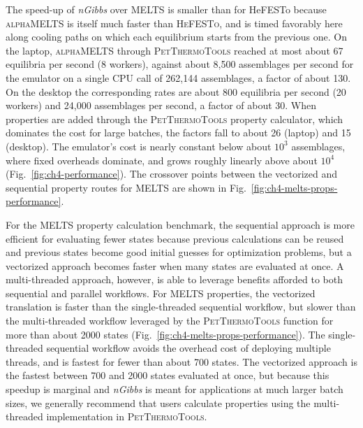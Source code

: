 The speed-up of \emph{nGibbs} over \textsc{MELTS} is smaller than for HeFESTo because \textsc{alphaMELTS} is itself much faster than \textsc{HeFESTo}, and is timed favorably
here along cooling paths on which each equilibrium starts from the previous one. On the laptop, \textsc{alphaMELTS} through
\textsc{PetThermoTools} reached at most about 67 equilibria per second (8 workers), against about 8{,}500 assemblages per second for
the emulator on a single CPU call of 262{,}144 assemblages, a factor of about 130. On the desktop the corresponding rates are about
800 equilibria per second (20 workers) and 24{,}000 assemblages per second, a factor of about 30. When properties are added through
the \textsc{PetThermoTools} property calculator, which dominates the cost for large batches, the factors fall to about 26 (laptop)
and 15 (desktop). The emulator's cost is nearly constant below about $10^3$ assemblages, where fixed overheads dominate, and grows
roughly linearly above about $10^4$ (Fig.~\ref{fig:ch4-performance}). The crossover points between the vectorized and sequential
property routes for \textsc{MELTS} are shown in Fig.~\ref{fig:ch4-melts-props-performance}.

For the \textsc{MELTS} property calculation benchmark, the sequential approach is more efficient for evaluating fewer states because previous calculations can be reused and previous states 
become good initial guesses for optimization problems, but a vectorized approach becomes faster when many states are evaluated at once. A multi-threaded approach, however, is able to leverage 
benefits afforded to both sequential and parallel workflows. For MELTS properties, the 
vectorized translation is faster than the single-threaded sequential workflow, but slower than the multi-threaded workflow leveraged by the \textsc{PetThermoTools} 
 function \citep{gleeson2025} for more than about 2000 states (Fig.~\ref{fig:ch4-melts-props-performance}). The single-threaded sequential workflow 
avoids the overhead cost of deploying multiple threads, and is fastest for fewer than about 700 states. The vectorized approach is the fastest between 700 and 2000 states evaluated at once, but because this speedup is marginal and 
\emph{nGibbs} is meant for applications at much larger batch sizes, we generally recommend that users calculate properties using the multi-threaded implementation in \textsc{PetThermoTools}. 

